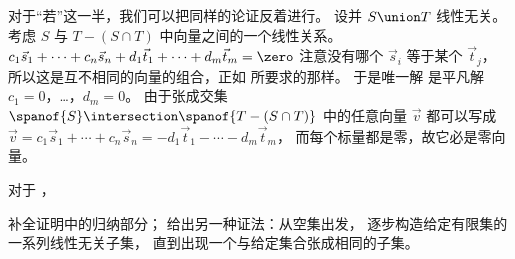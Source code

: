 \begin{answer}
\begin{exparts}
          对于“若”这一半，我们可以把同样的论证反着进行。
          设并 $S\union T$ 线性无关。
          考虑 $S$ 与 $T-(S\cap T)$ 中向量之间的一个线性关系。
          $c_1\vec{s}_1+\cdots+c_n\vec{s}_n
            +d_1\vec{t}_1+\cdots+d_m\vec{t}_m
            =\zero$
          注意没有哪个 $\vec{s}_i$ 等于某个 $\vec{t}_j$，
          所以这是互不相同的向量的组合，正如
          所要求的那样。
          于是唯一解
          是平凡解 $c_1=0$，\ldots，$d_m=0$。
          由于张成交集
          $\spanof{S}\intersection \spanof{T-(S\cap T)}$
          中的任意向量 $\vec{v}$
          都可以写成
          $\vec{v}=c_1\vec{s}_1+\cdots+c_n\vec{s}_n
            =-d_1\vec{t}_1-\cdots-d_m\vec{t}_m$，
          而每个标量都是零，故它必是零向量。
      \end{exparts}
    \end{answer}
  \item \label{exer:FillIndDetProofSetHasLISub}
    对于 ，
    \begin{exparts}
       \partsitem 补全证明中的归纳部分；
       \partsitem 给出另一种证法：从空集出发，
         逐步构造给定有限集的一系列线性无关子集，
         直到出现一个与给定集合张成相同的子集。
    \end{exparts}
